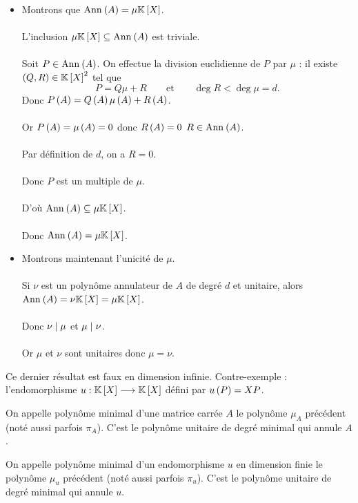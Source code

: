 \begin{dem}
\begin{itemize}
    \item Montrons que \(\Ann{A}=\mu\poly\). \\\\ L'inclusion \(\mu\poly\subset\Ann{A}\) est triviale. \\\\ Soit \(P\in\Ann{A}\). On effectue la division euclidienne de \(P\) par \(\mu\) : il existe \(\paren{Q,R}\in\poly^2\) tel que \[P=Q\mu+R\qquad\text{et}\qquad\deg R<\deg\mu=d.\] Donc \(P\left(A\right)=Q\left(A\right)\mu\left(A\right)+R\left(A\right)\). \\\\ Or \(P\left(A\right)=\mu\left(A\right)=0\) donc \(R\left(A\right)=0\) \ie \(R\in\Ann{A}\). \\\\ Par définition de \(d\), on a \(R=0\). \\\\ Donc \(P\) est un multiple de \(\mu\). \\\\ D'où \(\Ann{A}\subset\mu\poly\). \\\\ Donc \(\Ann{A}=\mu\poly\). \\
    \item Montrons maintenant l'unicité de \(\mu\). \\\\ Si \(\nu\) est un polynôme annulateur de \(A\) de degré \(d\) et unitaire, alors \(\Ann{A}=\nu\poly=\mu\poly\). \\\\ Donc \(\nu\mid\mu\) et \(\mu\mid\nu\). \\\\ Or \(\mu\) et \(\nu\) sont unitaires donc \(\mu=\nu\).
\end{itemize}
\end{dem}

\begin{rem}
Ce dernier résultat est faux en dimension infinie. Contre-exemple : l'endomorphisme \(u:\poly\to\poly\) défini par \(u\left(P\right)=XP\).
\end{rem}

\begin{defi}
On appelle polynôme minimal d'une matrice carrée \(A\) le polynôme \(\mu_A\) précédent (noté aussi parfois \(\pi_A\)). C'est le polynôme unitaire de degré minimal qui annule \(A\).

On appelle polynôme minimal d'un endomorphisme \(u\) en dimension finie le polynôme \(\mu_u\) précédent (noté aussi parfois \(\pi_u\)). C'est le polynôme unitaire de degré minimal qui annule \(u\).
\end{defi}

